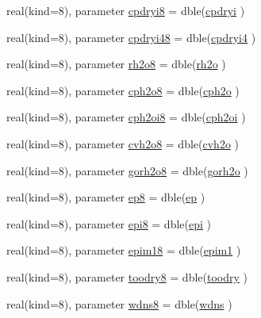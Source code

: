 \begin{DoxyCompactItemize}
\item 
real(kind=8), parameter \hyperlink{namespaceconsts__coms_ad41aea4d8cdd1fc3ef22d6a0a846ead0}{cpdryi8} = dble(\hyperlink{namespaceconsts__coms_a10e4ab661d502a2925676615fcff8f53}{cpdryi} )
\item 
real(kind=8), parameter \hyperlink{namespaceconsts__coms_a1607f8f37a44679745422794546587ce}{cpdryi48} = dble(\hyperlink{namespaceconsts__coms_ab8bcfd7d3be31463cbbd8d4977ea747c}{cpdryi4} )
\item 
real(kind=8), parameter \hyperlink{namespaceconsts__coms_ad9681369cddf5955b3bac4ce765a6c61}{rh2o8} = dble(\hyperlink{namespaceconsts__coms_ac3c72bd757c228e71a76062364a19c06}{rh2o} )
\item 
real(kind=8), parameter \hyperlink{namespaceconsts__coms_a90db8cf818bbde30510ef7860ff55303}{cph2o8} = dble(\hyperlink{namespaceconsts__coms_ab6845975c5a7d568270b99fac73cecee}{cph2o} )
\item 
real(kind=8), parameter \hyperlink{namespaceconsts__coms_ab6e3f79e0fef1414f52ea43de9f00a3f}{cph2oi8} = dble(\hyperlink{namespaceconsts__coms_a060b8a4312550437cd56f415d22df8a1}{cph2oi} )
\item 
real(kind=8), parameter \hyperlink{namespaceconsts__coms_a164ea9d19363574220b5b326c8c7555f}{cvh2o8} = dble(\hyperlink{namespaceconsts__coms_ab682f9c81b6c22b86609a07c45d0d169}{cvh2o} )
\item 
real(kind=8), parameter \hyperlink{namespaceconsts__coms_a9ec374a4fc22a5bdf63ad6a718f91c40}{gorh2o8} = dble(\hyperlink{namespaceconsts__coms_a0c33752e08988561908066daaa3574b9}{gorh2o} )
\item 
real(kind=8), parameter \hyperlink{namespaceconsts__coms_ae3bc0b10058a229de8516c83c216041b}{ep8} = dble(\hyperlink{namespaceconsts__coms_a7c4e3129334941133aea2f4408d79a4c}{ep} )
\item 
real(kind=8), parameter \hyperlink{namespaceconsts__coms_ac4526dc6415ddf34fb8185c076fd5521}{epi8} = dble(\hyperlink{namespaceconsts__coms_a907f95778dc27a8537377dbefeb43c0b}{epi} )
\item 
real(kind=8), parameter \hyperlink{namespaceconsts__coms_a32f01e2fc04a575b499b3003989de443}{epim18} = dble(\hyperlink{namespaceconsts__coms_a6f3042daf66dcb46bfb170331add64bb}{epim1} )
\item 
real(kind=8), parameter \hyperlink{namespaceconsts__coms_a997a12f52740babd7a7fecce0c0d489b}{toodry8} = dble(\hyperlink{namespaceconsts__coms_a363a55ffb8996335aa3e826419496dd6}{toodry} )
\item 
real(kind=8), parameter \hyperlink{namespaceconsts__coms_a463ad608b496ab02211a70ecfb8ed002}{wdns8} = dble(\hyperlink{namespaceconsts__coms_a831ac48090426d5432c26edb7cbac367}{wdns} )

\end{DoxyCompactItemize}
